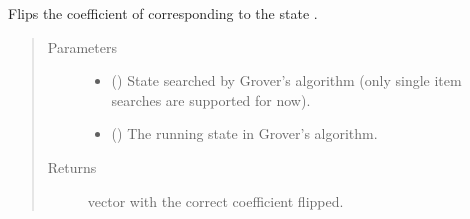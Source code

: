 \documentclass[letterpaper,10pt,english]{sphinxmanual}
\begin{document}

\begin{fulllineitems}
\label{\detokenize{grover:grover.oracle_artificial}}
Flips the coefficient of  corresponding to the state 
.
\begin{quote}\begin{description}
\item[{Parameters}] \leavevmode\begin{itemize}
\item {} 
 (\sphinxstyleliteralemphasis{\sphinxupquote{{[}}}\sphinxstyleliteralemphasis{\sphinxupquote{{]}}}) \textendash{} State searched by Grover’s algorithm 
(only single item searches are supported for now).

\item {} 
 () \textendash{} The running state in Grover’s algorithm.

\end{itemize}

\item[{Returns}] \leavevmode
vector \textendash{}  with the correct coefficient flipped.

\end{description}\end{quote}

\end{fulllineitems}

\end{document}
